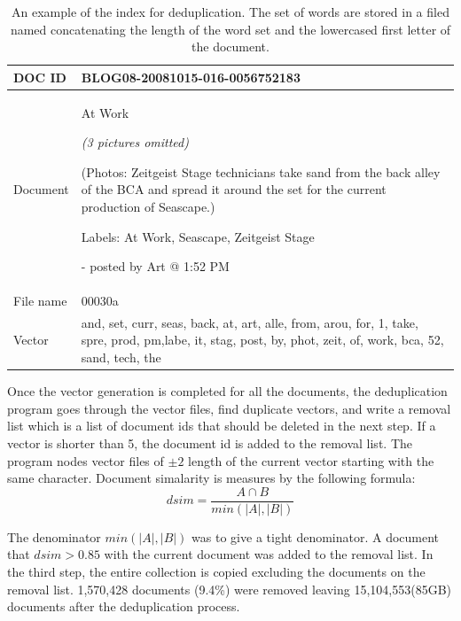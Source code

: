 \documentclass{sig-alternate}
\begin{document}
\begin{table}[h!t!]
\begin{center}
\begin{tabular}{l|p{6.0cm}}

\hline
DOC ID & BLOG08-20081015-016-0056752183\\ 

\hline
Document & 

At Work


\emph{(3 pictures omitted)}



(Photos: Zeitgeist Stage technicians take sand from the back alley of the BCA and spread it around the set for the current production of Seascape.)

Labels: At Work, Seascape, Zeitgeist Stage


- posted by Art @ 1:52 PM\\
\hline
File name& 00030a\\
\hline
Vector & and, set, curr, seas, back, at, art, alle, from, arou, for, 1, take, spre, prod, pm,labe, it, stag, post, by, phot, zeit, of, work, bca, 52, sand, tech, the\\

\hline
\end{tabular}
\caption{An example of the index for deduplication. The set of words are stored in a filed named concatenating the length of the word set and the lowercased first letter of the document.}
\label{table:dedup}
\end{center}
\end{table}


Once the vector generation is completed for all the documents, the deduplication program goes through the vector files, find duplicate vectors, and write a removal list which is a list of document ids that should be deleted in the next step. If a vector is shorter than 5, the document id is added to the removal list. The program nodes vector files of $\pm 2$ length of the current vector starting with the same character. Document simalarity is measures by the following formula:
\begin{displaymath}
dsim=\frac{A \cap B}  {min(|A|, |B|)}
\end{displaymath}

The denominator $min(|A|, |B|)$ was to give a tight denominator. A document that $dsim > 0.85$ with the current document was added to the removal list. In the third step, the entire collection is copied excluding the documents on the removal list. 1,570,428 documents (9.4\%) were removed leaving 15,104,553(85GB) documents after the deduplication process.
\end{document}
